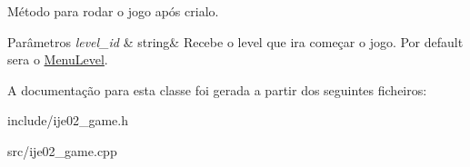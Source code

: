 Método para rodar o jogo após crialo. 


\begin{DoxyParams}{Parâmetros}
{\em level\+\_\+id} & string\& Recebe o level que ira começar o jogo. Por default sera o \mbox{\hyperlink{classMenuLevel}{Menu\+Level}}. \\
\hline
\end{DoxyParams}


A documentação para esta classe foi gerada a partir dos seguintes ficheiros\+:\begin{DoxyCompactItemize}
\item 
include/ije02\+\_\+game.\+h\item 
src/ije02\+\_\+game.\+cpp\end{DoxyCompactItemize}
